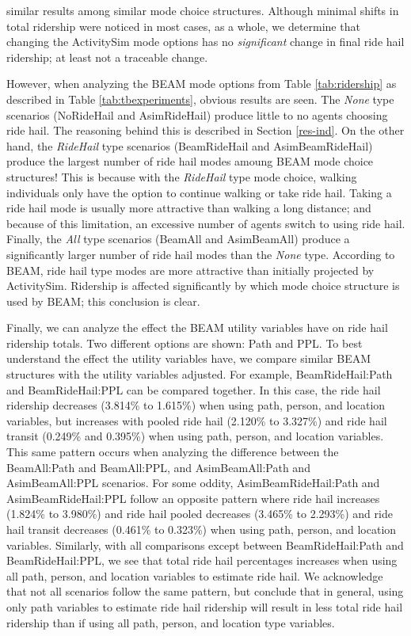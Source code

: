 \documentclass[12pt, oneside, openright]{byuthesis}
\begin{document}
similar results among similar mode choice structures. Although minimal shifts in total ridership were noticed in most cases, as a whole, we determine that changing the ActivitySim mode options has no \emph{significant} change in final ride hail ridership; at least not a traceable change.

However, when analyzing the BEAM mode options from Table \ref{tab:ridership} as described in Table \ref{tab:tbexperiments}, obvious results are seen. The \emph{None} type scenarios (NoRideHail and AsimRideHail) produce little to no agents choosing ride hail. The reasoning behind this is described in Section \ref{res-ind}. On the other hand, the \emph{RideHail} type scenarios (BeamRideHail and AsimBeamRideHail) produce the largest number of ride hail modes amoung BEAM mode choice structures! This is because with the \emph{RideHail} type mode choice, walking individuals only have the option to continue walking or take ride hail. Taking a ride hail mode is usually more attractive than walking a long distance; and because of this limitation, an excessive number of agents switch to using ride hail. Finally, the \emph{All} type scenarios (BeamAll and AsimBeamAll) produce a significantly larger number of ride hail modes than the \emph{None} type. According to BEAM, ride hail type modes are more attractive than initially projected by ActivitySim. Ridership is affected significantly by which mode choice structure is used by BEAM; this conclusion is clear.

Finally, we can analyze the effect the BEAM utility variables have on ride hail ridership totals. Two different options are shown: Path and PPL. To best understand the effect the utility variables have, we compare similar BEAM structures with the utility variables adjusted. For example, BeamRideHail:Path and BeamRideHail:PPL can be compared together. In this case, the ride hail ridership decreases (3.814\% to 1.615\%) when using path, person, and location variables, but increases with pooled ride hail (2.120\% to 3.327\%) and ride hail transit (0.249\% and 0.395\%) when using path, person, and location variables. This same pattern occurs when analyzing the difference between the BeamAll:Path and BeamAll:PPL, and AsimBeamAll:Path and AsimBeamAll:PPL scenarios. For some oddity, AsimBeamRideHail:Path and AsimBeamRideHail:PPL follow an opposite pattern where ride hail increases (1.824\% to 3.980\%) and ride hail pooled decreases (3.465\% to 2.293\%) and ride hail transit decreases (0.461\% to 0.323\%) when using path, person, and location variables. Similarly, with all comparisons except between BeamRideHail:Path and BeamRideHail:PPL, we see that total ride hail percentages increases when using all path, person, and location variables to estimate ride hail. We acknowledge that not all scenarios follow the same pattern, but conclude that in general, using only path variables to estimate ride hail ridership will result in less total ride hail ridership than if using all path, person, and location type variables.
\end{document}
